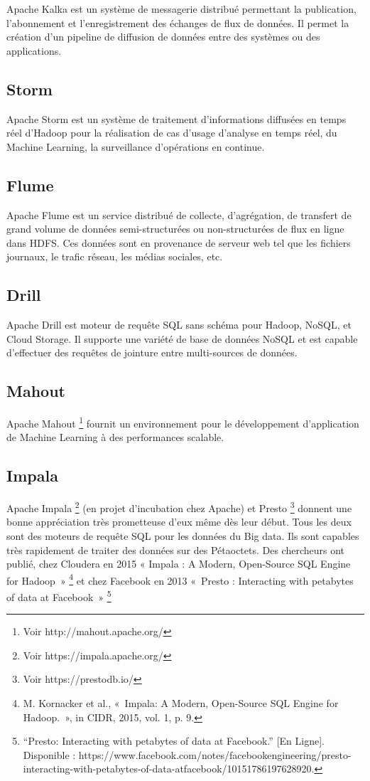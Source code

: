 \documentclass[12pt,french]{book}
\begin{document}
Apache Kalka est un système de messagerie distribué permettant la publication, l’abonnement et l’enregistrement des échanges de flux de données. Il permet la création d’un pipeline de diffusion de données entre des systèmes ou des applications. 

\subsection{Storm}

Apache Storm est un système de traitement d’informations diffusées en temps réel d’Hadoop pour la réalisation de cas d’usage d’analyse en temps réel, du Machine Learning, la surveillance d’opérations en continue.

\subsection{Flume}

Apache Flume est un service distribué de collecte, d’agrégation, de transfert de grand volume de données semi-structurées ou non-structurées de flux en ligne dans HDFS. Ces données sont en provenance de serveur web tel que les fichiers journaux, le trafic réseau, les médias sociales, etc.

\subsection{Drill}

Apache Drill est moteur de requête SQL sans schéma pour Hadoop, NoSQL, et Cloud Storage. Il supporte une variété de base de données NoSQL et est capable d’effectuer des requêtes de jointure entre multi-sources de données.  

\subsection{Mahout}

Apache Mahout \footnote{Voir http://mahout.apache.org/} fournit un environnement pour le développement d’application de Machine Learning à des performances scalable.

\subsection{Impala}

Apache Impala \footnote{Voir https://impala.apache.org/} (en projet d’incubation chez Apache) et Presto \footnote{Voir https://prestodb.io/} donnent une bonne appréciation très prometteuse d’eux même dès leur début.
Tous les deux sont des moteurs de requête SQL pour les données du Big data. Ils sont capables très rapidement de traiter des données sur des Pétaoctets. Des chercheurs ont publié, chez Cloudera en 2015 « Impala : A Modern, Open-Source SQL Engine for Hadoop » \footnote{M. Kornacker et al., « Impala: A Modern, Open-Source SQL Engine for Hadoop. », in CIDR, 2015, vol. 1, p. 9.} et chez Facebook en 2013 « Presto : Interacting with petabytes of data at Facebook » \footnote{“Presto: Interacting with petabytes of data at Facebook.” [En Ligne]. Disponible : https://www.facebook.com/notes/facebookengineering/presto-interacting-with-petabytes-of-data-atfacebook/10151786197628920.}
\end{document}
